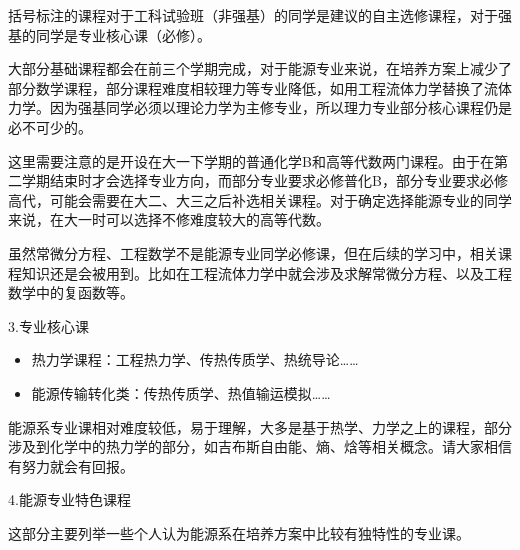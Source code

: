 括号标注的课程对于工科试验班（非强基）的同学是建议的自主选修课程，对于强基的同学是专业核心课（必修）。

\vspace{10pt}

大部分基础课程都会在前三个学期完成，对于能源专业来说，在培养方案上减少了部分数学课程，部分课程难度相较理力等专业降低，如用工程流体力学替换了流体力学。因为强基同学必须以理论力学为主修专业，所以理力专业部分核心课程仍是必不可少的。

\vspace{10pt}

这里需要注意的是开设在大一下学期的普通化学B和高等代数两门课程。由于在第二学期结束时才会选择专业方向，而部分专业要求必修普化B，部分专业要求必修高代，可能会需要在大二、大三之后补选相关课程。对于确定选择能源专业的同学来说，在大一时可以选择不修难度较大的高等代数。

\vspace{10pt}

虽然常微分方程、工程数学不是能源专业同学必修课，但在后续的学习中，相关课程知识还是会被用到。比如在工程流体力学中就会涉及求解常微分方程、以及工程数学中的复函数等。

\vspace{10pt}

3.专业核心课
\begin{itemize}
	\item 热力学课程：工程热力学、传热传质学、热统导论……
	
	\item 能源传输转化类：传热传质学、热值输运模拟……
	
\end{itemize}


能源系专业课相对难度较低，易于理解，大多是基于热学、力学之上的课程，部分涉及到化学中的热力学的部分，如吉布斯自由能、熵、焓等相关概念。请大家相信有努力就会有回报。

\vspace{10pt}

4.能源专业特色课程

这部分主要列举一些个人认为能源系在培养方案中比较有独特性的专业课。

